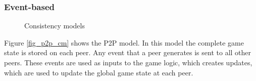 \documentclass[journal,oneside,a4paper,onecolumn]{IEEEtran}
\begin{document}
\subsubsection{Event-based}

\begin{figure}[htbp]
\centering
{}
\caption{Consistency models}
\end{figure}
%
Figure \ref{fig_p2p_cm} shows the P2P model. In this model the complete game state is stored on each peer. Any event that a peer generates is sent to all other peers. These events are used as inputs to the game logic, which creates updates, which are used to update the global game state at each peer.
\end{document}
